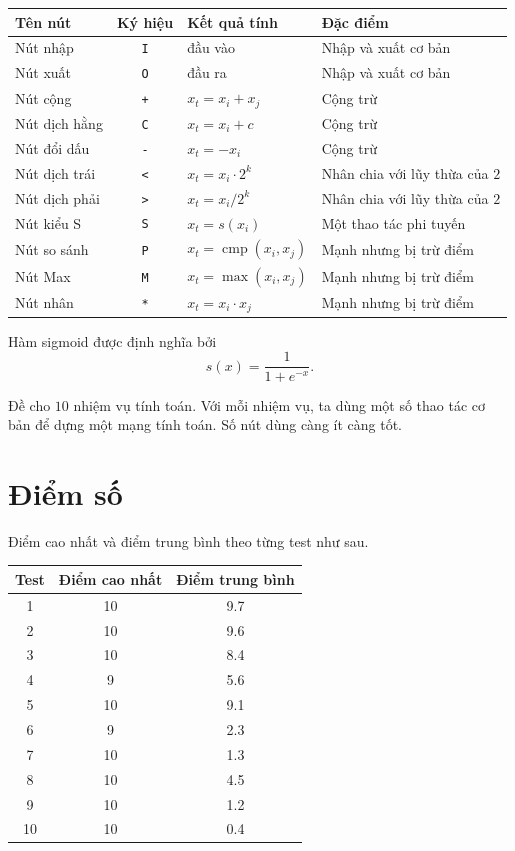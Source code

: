\documentclass[11pt]{article}
\begin{document}
\begin{center}
\small
\begin{tabular}{|>{\raggedright\arraybackslash}p{}|c|>{\centering\arraybackslash}p{}|>{\raggedright\arraybackslash}p{}|}
\hline
Tên nút & Ký hiệu & Kết quả tính & Đặc điểm \\
\hline
Nút nhập & \texttt{I} & đầu vào & Nhập và xuất cơ bản \\
\hline
Nút xuất & \texttt{O} & đầu ra & Nhập và xuất cơ bản \\
\hline
Nút cộng & \texttt{+} & $x_t=x_i+x_j$ & Cộng trừ \\
\hline
Nút dịch hằng & \texttt{C} & $x_t=x_i+c$ & Cộng trừ \\
\hline
Nút đổi dấu & \texttt{-} & $x_t=-x_i$ & Cộng trừ \\
\hline
Nút dịch trái & \texttt{<} & $x_t=x_i\cdot 2^k$ & Nhân chia với lũy thừa của $2$ \\
\hline
Nút dịch phải & \texttt{>} & $x_t=x_i/2^k$ & Nhân chia với lũy thừa của $2$ \\
\hline
Nút kiểu S & \texttt{S} & $x_t=s(x_i)$ & Một thao tác phi tuyến \\
\hline
Nút so sánh & \texttt{P} & $x_t=\operatorname{cmp}(x_i,x_j)$ & Mạnh nhưng bị trừ điểm \\
\hline
Nút Max & \texttt{M} & $x_t=\max(x_i,x_j)$ & Mạnh nhưng bị trừ điểm \\
\hline
Nút nhân & \texttt{*} & $x_t=x_i\cdot x_j$ & Mạnh nhưng bị trừ điểm \\
\hline
\end{tabular}
\end{center}

Hàm sigmoid được định nghĩa bởi
\[
  s(x)=\frac{1}{1+e^{-x}}.
\]

Đề cho $10$ nhiệm vụ tính toán. Với mỗi nhiệm vụ, ta dùng một số thao tác cơ
bản để dựng một mạng tính toán. Số nút dùng càng ít càng tốt.

\section{Điểm số}

Điểm cao nhất và điểm trung bình theo từng test như sau.

\begin{center}
\begin{tabular}{|c|c|c|}
\hline
Test & Điểm cao nhất & Điểm trung bình \\
\hline
1 & 10 & 9.7 \\
2 & 10 & 9.6 \\
3 & 10 & 8.4 \\
4 & 9 & 5.6 \\
5 & 10 & 9.1 \\
6 & 9 & 2.3 \\
7 & 10 & 1.3 \\
8 & 10 & 4.5 \\
9 & 10 & 1.2 \\
10 & 10 & 0.4 \\
\hline
\end{tabular}
\end{center}
\end{document}
